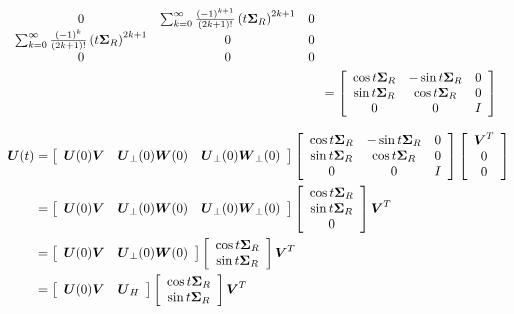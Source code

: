 \documentclass[11pt]{article}
\begin{document}
\begin{enumerate}
\begin{align*}
{\begin{array}{ccc}
0 & \sum_{k=0}^{\infty}\frac{(-1)^{k+1}}{(2k+1)!}\left(t\boldsymbol{\Sigma}_{R}\right)^{2k+1} & 0 \\ 
\sum_{k=0}^{\infty}\frac{(-1)^{k}}{(2k+1)!}\left(t\boldsymbol{\Sigma}_{R}\right)^{2k+1}& 0 & 0 \\ 
0 & 0 & 0
\end{array}}\\
&= \left[\begin{array}{ccc}
\cos t\boldsymbol{\Sigma}_{R} & -\sin t\boldsymbol{\Sigma}_{R}& 0 \\ 
\sin t\boldsymbol{\Sigma}_{R} & \cos t\boldsymbol{\Sigma}_{R} & 0 \\ 
0 & 0 & I
\end{array}\right]
\end{align*}


\begin{align}
\boldsymbol{U}(t) &=\left[\begin{array}{ccc}
\boldsymbol{U}(0)\boldsymbol{V} & \boldsymbol{U}_{\bot}(0) \boldsymbol{W}(0) & \boldsymbol{U}_{\bot}(0) \boldsymbol{W}_{\bot}(0)
\end{array}\right]\left[\begin{array}{ccc}
\cos t\boldsymbol{\Sigma}_{R} & -\sin t\boldsymbol{\Sigma}_{R}& 0 \\ 
\sin t\boldsymbol{\Sigma}_{R} & \cos t\boldsymbol{\Sigma}_{R} & 0 \\ 
0 & 0 & I
\end{array}\right]\left[\begin{array}{c}
\boldsymbol{V}^{T} \\
 0\\ 
0 
\end{array} \right] \nonumber \\
&= \left[\begin{array}{ccc}
\boldsymbol{U}(0)\boldsymbol{V} & \boldsymbol{U}_{\bot}(0) \boldsymbol{W}(0) & \boldsymbol{U}_{\bot}(0) \boldsymbol{W}_{\bot}(0)
\end{array}\right]\left[\begin{array}{c}
\cos t\boldsymbol{\Sigma}_{R}\\
\sin t\boldsymbol{\Sigma}_{R} \\
0 
\end{array}\right]\boldsymbol{V}^{T} \nonumber\\
&= 
\left[\begin{array}{cc}
\boldsymbol{U}(0)\boldsymbol{V} & \boldsymbol{U}_{\bot}(0) \boldsymbol{W}(0) 
\end{array}\right]\left[\begin{array}{c}
\cos t\boldsymbol{\Sigma}_{R}\\
\sin t\boldsymbol{\Sigma}_{R} 
\end{array}\right]\boldsymbol{V}^{T}\nonumber\\
&=
\left[\begin{array}{cc}
\boldsymbol{U}(0)\boldsymbol{V} & \boldsymbol{U}_{H}
\end{array}\right]\left[\begin{array}{c}
\cos t\boldsymbol{\Sigma}_{R}\\
\sin t\boldsymbol{\Sigma}_{R} 
\end{array}\right]\boldsymbol{V}^{T}\nonumber
\end{align}


\end{enumerate}
\end{document}
